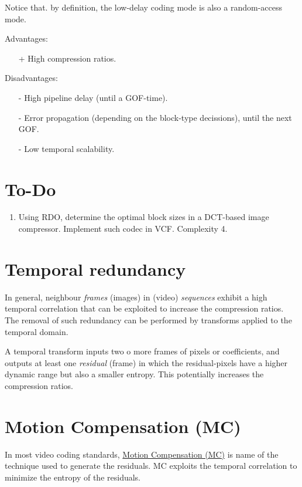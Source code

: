 Notice that. by definition, the low-delay coding mode is also a
random-access mode.

Advantages:
\begin{itemize}
\item [+] High compression ratios.
\end{itemize}

Disadvantages:
\begin{enumerate}
\item [-] High pipeline delay (until a GOF-time).
\item [-] Error propagation (depending on the block-type decissions),
  until the next GOF.
\item [-] Low temporal scalability.
\end{enumerate}

\section{To-Do}
\begin{enumerate}
\item Using RDO, determine the optimal block sizes in a DCT-based
  image compressor. Implement such codec in VCF. Complexity 4.
\end{enumerate}

\section{Temporal redundancy}

In general, neighbour \emph{frames} (images) in (video)
\emph{sequences} exhibit a high temporal correlation that can be
exploited to increase the compression ratios. The removal of such
redundancy can be performed by transforms applied to the temporal
domain.

A temporal transform inputs two o more frames of pixels or
coefficients, and outputs at least one \emph{residual} (frame) in
which the residual-pixels have a higher dynamic range but also a
smaller entropy. This potentially increases the compression ratios.


\section{Motion Compensation (MC)}

In most video coding standards,
\href{https://en.wikipedia.org/wiki/Motion_compensation}{Motion
  Compensation (MC)} is name of the technique used to generate the
residuals. MC exploits the temporal correlation to minimize the
entropy of the residuals.

